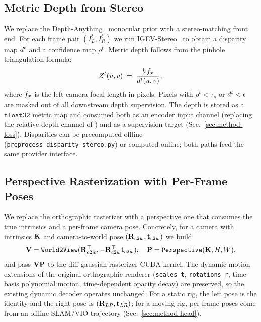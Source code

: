 \subsection{Metric Depth from Stereo}
\label{sec:method-depth}

We replace the Depth-Anything~\cite{yang2024depth} monocular prior with a
stereo-matching front end. For each frame pair $(I_L^t, I_R^t)$ we run
IGEV-Stereo~\cite{xu2023igev} to obtain a disparity map
$d^t$ and a confidence map $\rho^t$. Metric depth follows from the
pinhole triangulation formula:
\begin{equation}
\label{eq:triang}
Z^t(u,v) \;=\; \frac{b \, f_x}{d^t(u,v)},
\end{equation}
where $f_x$ is the left-camera focal length in pixels. Pixels with
$\rho^t < \tau_\rho$ or $d^t < \epsilon$ are masked out of all
downstream depth supervision. The depth is stored as a
$\mathtt{float32}$ metric map and consumed both as an encoder input
channel (replacing the relative-depth channel of \StreamSplat) and as a
supervision target (Sec.~\ref{sec:method-loss}). Disparities can be
precomputed offline (\texttt{preprocess\_disparity\_stereo.py}) or
computed online; both paths feed the same provider interface.

\subsection{Perspective Rasterization with Per-Frame Poses}
\label{sec:method-raster}

We replace the orthographic rasterizer with a perspective one that
consumes the true intrinsics and a per-frame camera pose. Concretely, for
a camera with intrinsics $\mathbf{K}$ and camera-to-world pose
$(\mathbf{R}_{c2w}, \mathbf{t}_{c2w})$ we build
\begin{equation}
\mathbf{V} = \texttt{World2View}(\mathbf{R}_{c2w}^\top, -\mathbf{R}_{c2w}^\top \mathbf{t}_{c2w}),\quad
\mathbf{P} = \texttt{Perspective}(\mathbf{K}, H, W),
\end{equation}
and pass $\mathbf{V} \mathbf{P}$ to the diff-gaussian-rasterizer CUDA kernel. The
dynamic-motion extensions of the original orthographic renderer
(\texttt{scales\_t}, \texttt{rotations\_r}, time-basis polynomial motion,
time-dependent opacity decay) are preserved, so the existing dynamic
decoder operates unchanged. For a static rig, the left pose is the
identity and the right pose is $(\mathbf{R}_{LR}, \mathbf{t}_{LR})$; for a moving
rig, per-frame poses come from an offline SLAM/VIO trajectory
(Sec.~\ref{sec:method-head}).

